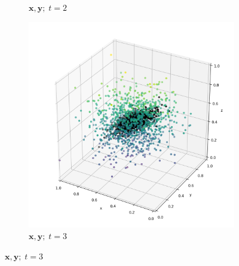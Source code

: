 \documentclass[12pt, aspectratio=169]{beamer}
\newcommand{\xx}{\mathbf{x}}
\newcommand{\yy}{\mathbf{y}}
\begin{document}
\begin{frame}
\begin{figure}[H]
\begin{subfigure}{0.2\textwidth}
			\caption{$\xx, \yy; \; t=2$}
			\label{fig:2}
		\end{subfigure}\hfil
		\begin{subfigure}{0.2\textwidth}
			\includegraphics[width=\linewidth]{resources/X_Y_3_simulated.png}
			\caption{$\xx, \yy; \; t=3$}
			\label{fig:3}
		\end{subfigure}
		

\end{figure}
\end{frame}
\end{document}
